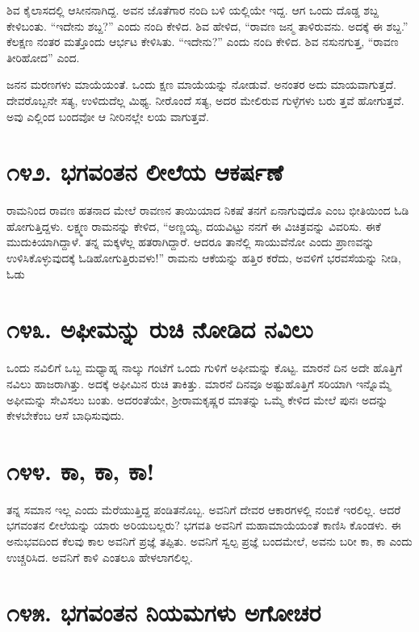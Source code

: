 ಶಿವ ಕೈಲಾಸದಲ್ಲಿ ಆಸೀನನಾಗಿದ್ದ. ಅವನ ಜೊತೆಗಾರ ನಂದಿ ಬಳಿ ಯಲ್ಲಿಯೇ ಇದ್ದ. ಆಗ ಒಂದು ದೊಡ್ಡ ಶಬ್ದ ಕೇಳಿಬಂತು. “ಇದೇನು ಶಬ್ದ?” ಎಂದು ನಂದಿ ಕೇಳಿದ. ಶಿವ ಹೇಳಿದ, “ರಾವಣ ಜನ್ಮ ತಾಳಿರುವನು. ಅದಕ್ಕೆ ಈ ಶಬ್ದ.” ಕೆಲಕ್ಷಣ ನಂತರ ಮತ್ತೊಂದು ಆರ್ಭಟ ಕೇಳಿಸಿತು. “ಇದೇನು?” ಎಂದು ನಂದಿ ಕೇಳಿದ. ಶಿವ ನಸುನಗುತ್ತ, “ರಾವಣ ತೀರಿಹೋದ” ಎಂದ.

ಜನನ ಮರಣಗಳು ಮಾಯೆಯಂತೆ. ಒಂದು ಕ್ಷಣ ಮಾಯೆಯನ್ನು ನೋಡುವೆ. ಅನಂತರ ಅದು ಮಾಯವಾಗುತ್ತದೆ. ದೇವರೊಬ್ಬನೇ ಸತ್ಯ, ಉಳಿದುದೆಲ್ಲ ಮಿಥ್ಯ. ನೀರೊಂದೆ ಸತ್ಯ, ಅದರ ಮೇಲಿರುವ ಗುಳ್ಳೆಗಳು ಬರು ತ್ತವೆ ಹೋಗುತ್ತವೆ. ಅವು ಎಲ್ಲಿಂದ ಬಂದವೋ ಆ ನೀರಿನಲ್ಲೇ ಲಯ ವಾಗುತ್ತವೆ.


\section{\num{೧೪೨. } ಭಗವಂತನ ಲೀಲೆಯ ಆಕರ್ಷಣೆ}

ರಾಮನಿಂದ ರಾವಣ ಹತನಾದ ಮೇಲೆ ರಾವಣನ ತಾಯಿಯಾದ ನಿಕಷೆ ತನಗೆ ಏನಾಗುವುದೊ ಎಂಬ ಭೀತಿಯಿಂದ ಓಡಿ ಹೋಗುತ್ತಿದ್ದಳು. ಲಕ್ಷ್ಮಣ ರಾಮನನ್ನು ಕೇಳಿದ, “ಅಣ್ಣಯ್ಯ, ದಯವಿಟ್ಟು ನನಗೆ ಈ ವಿಚಿತ್ರವನ್ನು ವಿವರಿಸು. ಈಕೆ ಮುದುಕಿಯಾಗಿದ್ದಾಳೆ. ತನ್ನ ಮಕ್ಕಳೆಲ್ಲ ಹತರಾಗಿದ್ದಾರೆ. ಆದರೂ ತಾನೆಲ್ಲಿ ಸಾಯುವೆನೋ ಎಂದು ಪ್ರಾಣವನ್ನು ಉಳಿಸಿಕೊಳ್ಳುವುದಕ್ಕೆ ಓಡಿಹೋಗುತ್ತಿರುವಳು!” ರಾಮನು ಆಕೆಯನ್ನು ಹತ್ತಿರ ಕರೆದು, ಅವಳಿಗೆ ಭರವಸೆಯನ್ನು ನೀಡಿ, ಓಡು



\section{\num{೧೪೩. } ಅಫೀಮನ್ನು ರುಚಿ ನೋಡಿದ ನವಿಲು}

ಒಂದು ನವಿಲಿಗೆ ಒಬ್ಬ ಮಧ್ಯಾಹ್ನ ನಾಲ್ಕು ಗಂಟೆಗೆ ಒಂದು ಗುಳಿಗೆ ಅಫೀಮನ್ನು ಕೊಟ್ಟ. ಮಾರನೆ ದಿನ ಅದೇ ಹೊತ್ತಿಗೆ ನವಿಲು ಹಾಜರಾಗಿತ್ತು. ಅದಕ್ಕೆ ಅಫೀಮಿನ ರುಚಿ ತಾಕಿತ್ತು. ಮಾರನೆ ದಿನವೂ ಅಷ್ಟುಹೊತ್ತಿಗೆ ಸರಿಯಾಗಿ ಇನ್ನೊಮ್ಮೆ ಅಫೀಮನ್ನು ಸೇವಿಸಲು ಬಂತು. ಅದರಂತೆಯೇ, ಶ್ರೀರಾಮಕೃಷ್ಣರ ಮಾತನ್ನು ಒಮ್ಮೆ ಕೇಳಿದ ಮೇಲೆ ಪುನಃ ಅದನ್ನು ಕೇಳಬೇಕೆಂಬ ಆಸೆ ಬಾಧಿಸುವುದು.


\section{\num{೧೪೪. } ಕಾ, ಕಾ, ಕಾ!}

ತನ್ನ ಸಮಾನ ಇಲ್ಲ ಎಂದು ಮೆರೆಯುತ್ತಿದ್ದ ಪಂಡಿತನೊಬ್ಬ. ಅವನಿಗೆ ದೇವರ ಆಕಾರಗಳಲ್ಲಿ ನಂಬಿಕೆ ಇರಲಿಲ್ಲ. ಆದರೆ ಭಗವಂತನ ಲೀಲೆಯನ್ನು ಯಾರು ಅರಿಯಬಲ್ಲರು? ಭಗವತಿ ಅವನಿಗೆ ಮಹಾಮಾಯೆಯಂತೆ ಕಾಣಿಸಿ ಕೊಂಡಳು. ಈ ಅನುಭವದಿಂದ ಕೆಲವು ಕಾಲ ಅವನಿಗೆ ಪ್ರಜ್ಞೆ ತಪ್ಪಿತು. ಅವನಿಗೆ ಸ್ವಲ್ಪ ಪ್ರಜ್ಞೆ ಬಂದಮೇಲೆ, ಅವನು ಬರೀ ಕಾ, ಕಾ ಎಂದು ಉಚ್ಚರಿಸಿದ. ಅವನಿಗೆ ಕಾಳಿ ಎಂತಲೂ ಹೇಳಲಾಗಲಿಲ್ಲ.


\section{\num{೧೪೫. } ಭಗವಂತನ ನಿಯಮಗಳು ಅಗೋಚರ}

